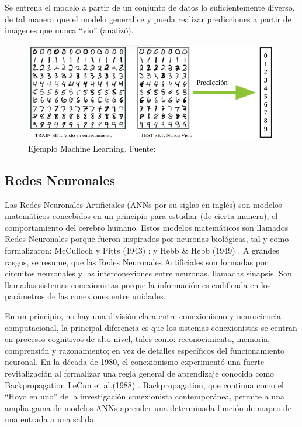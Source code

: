 Se entrena el modelo a partir de un conjunto de datos lo suficientemente diverso, de tal manera que el modelo generalice y pueda realizar predicciones a partir de imágenes que nunca ``vio'' (analizó).

\begin{figure}[h!]
    \centering
    \includegraphics[width=1\textwidth]{img/RedNeuronal1.png}
    \caption{Ejemplo Machine Learning. Fuente: \cite{img_RedNeuronal1}}
    \label{fig:red neuronal 1}
\end{figure}

\subsection{Redes Neuronales}
Las Redes Neuronales Artificiales (ANNs por su siglas en inglés) son modelos matemáticos concebidos en un principio para estudiar (de cierta manera), el comportamiento del cerebro humano.
Estos modelos matemáticos son llamados Redes Neuronales porque fueron inspirados por neuronas biológicas, tal y como formalizaron: McCulloch y Pitts (1943) \cite{McCulloch1943-nf}; y Hebb & Hebb (1949) \cite{Morris1999-xd}. A grandes rasgos, se resume, que las Redes Neuronales Artificiales son formadas por circuitos neuronales y las interconexiones entre neuronas, llamadas sinapsis. Son llamadas sistemas conexionistas porque la información es codificada en los parámetros de las conexiones entre unidades.

En un principio, no hay una división clara entre conexionismo y neurociencia computacional, la principal diferencia es que los sistemas conexionistas se centran en procesos cognitivos de alto nivel, tales como: reconocimiento, memoria, comprensión  y razonamiento; en vez de detalles específicos del funcionamiento neuronal. En la década de 1980, el conexionismo experimentó una fuerte revitalización al formalizar una regla general de aprendizaje conocida como Backpropagation LeCun et al.(1988) \cite{lecun}. Backpropagation, que continua como el ``Hoyo en uno'' de la investigación conexionista contemporánea, permite a una amplia gama de modelos ANNs aprender una determinada función de mapeo de una entrada a una salida.

